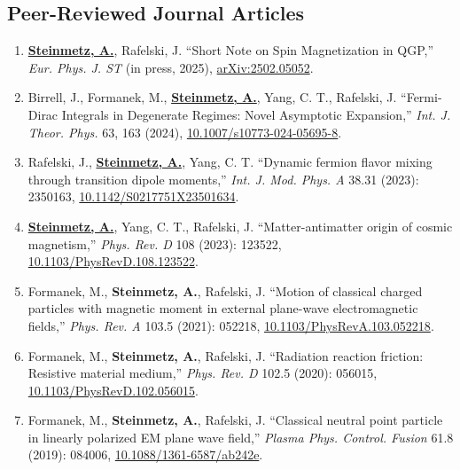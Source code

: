 \documentclass[11pt]{article}
\begin{document}
\subsection*{Peer-Reviewed Journal Articles}
\begin{enumerate}[leftmargin=*,nosep]
    \item \textbf{\href{https://github.com/ajsteinmetz/short-note-qgp}{Steinmetz, A.}}, Rafelski, J. ``Short Note on Spin Magnetization in QGP,'' \textit{Eur. Phys. J. ST} (in press, 2025), \href{https://doi.org/10.48550/arXiv.2502.05052}{arXiv:2502.05052}.
    \item Birrell, J., Formanek, M., \textbf{\href{https://github.com/ajsteinmetz/fermi-distribution}{Steinmetz, A.}}, Yang, C. T., Rafelski, J. ``Fermi-Dirac Integrals in Degenerate Regimes: Novel Asymptotic Expansion,'' \textit{Int. J. Theor. Phys.} 63, 163 (2024), \href{https://doi.org/10.1007/s10773-024-05695-8}{10.1007/s10773-024-05695-8}.
    \item Rafelski, J., \textbf{\href{https://github.com/ajsteinmetz/neutrino-transition-moments}{Steinmetz, A.}}, Yang, C. T. ``Dynamic fermion flavor mixing through transition dipole moments,'' \textit{Int. J. Mod. Phys. A} 38.31 (2023): 2350163, \href{https://doi.org/10.1142/S0217751X23501634}{10.1142/S0217751X23501634}.
    \item \textbf{\href{https://github.com/ajsteinmetz/plasma-partition}{Steinmetz, A.}}, Yang, C. T., Rafelski, J. ``Matter-antimatter origin of cosmic magnetism,'' \textit{Phys. Rev. D} 108 (2023): 123522, \href{https://doi.org/10.1103/PhysRevD.108.123522}{10.1103/PhysRevD.108.123522}.
    \item Formanek, M., \textbf{Steinmetz, A.}, Rafelski, J. ``Motion of classical charged particles with magnetic moment in external plane-wave electromagnetic fields,'' \textit{Phys. Rev. A} 103.5 (2021): 052218, \href{https://doi.org/10.1103/PhysRevA.103.052218}{10.1103/PhysRevA.103.052218}.
    \item Formanek, M., \textbf{Steinmetz, A.}, Rafelski, J. ``Radiation reaction friction: Resistive material medium,'' \textit{Phys. Rev. D} 102.5 (2020): 056015, \href{https://doi.org/10.1103/PhysRevD.102.056015}{10.1103/PhysRevD.102.056015}.
    \item Formanek, M., \textbf{Steinmetz, A.}, Rafelski, J. ``Classical neutral point particle in linearly polarized EM plane wave field,'' \textit{Plasma Phys. Control. Fusion} 61.8 (2019): 084006, \href{https://doi.org/10.1088/1361-6587/ab242e}{10.1088/1361-6587/ab242e}.

\end{enumerate}
\end{document}
